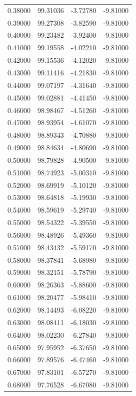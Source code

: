 \begin{table}
\begin{tabular}{llll}
0.38000 & 99.31036 & -3.72780 & -9.81000 \\
0.39000 & 99.27308 & -3.82590 & -9.81000 \\
0.40000 & 99.23482 & -3.92400 & -9.81000 \\
0.41000 & 99.19558 & -4.02210 & -9.81000 \\
0.42000 & 99.15536 & -4.12020 & -9.81000 \\
0.43000 & 99.11416 & -4.21830 & -9.81000 \\
0.44000 & 99.07197 & -4.31640 & -9.81000 \\
0.45000 & 99.02881 & -4.41450 & -9.81000 \\
0.46000 & 98.98467 & -4.51260 & -9.81000 \\
0.47000 & 98.93954 & -4.61070 & -9.81000 \\
0.48000 & 98.89343 & -4.70880 & -9.81000 \\
0.49000 & 98.84634 & -4.80690 & -9.81000 \\
0.50000 & 98.79828 & -4.90500 & -9.81000 \\
0.51000 & 98.74923 & -5.00310 & -9.81000 \\
0.52000 & 98.69919 & -5.10120 & -9.81000 \\
0.53000 & 98.64818 & -5.19930 & -9.81000 \\
0.54000 & 98.59619 & -5.29740 & -9.81000 \\
0.55000 & 98.54322 & -5.39550 & -9.81000 \\
0.56000 & 98.48926 & -5.49360 & -9.81000 \\
0.57000 & 98.43432 & -5.59170 & -9.81000 \\
0.58000 & 98.37841 & -5.68980 & -9.81000 \\
0.59000 & 98.32151 & -5.78790 & -9.81000 \\
0.60000 & 98.26363 & -5.88600 & -9.81000 \\
0.61000 & 98.20477 & -5.98410 & -9.81000 \\
0.62000 & 98.14493 & -6.08220 & -9.81000 \\
0.63000 & 98.08411 & -6.18030 & -9.81000 \\
0.64000 & 98.02230 & -6.27840 & -9.81000 \\
0.65000 & 97.95952 & -6.37650 & -9.81000 \\
0.66000 & 97.89576 & -6.47460 & -9.81000 \\
0.67000 & 97.83101 & -6.57270 & -9.81000 \\
0.68000 & 97.76528 & -6.67080 & -9.81000 \\

\end{tabular}
\end{table}
